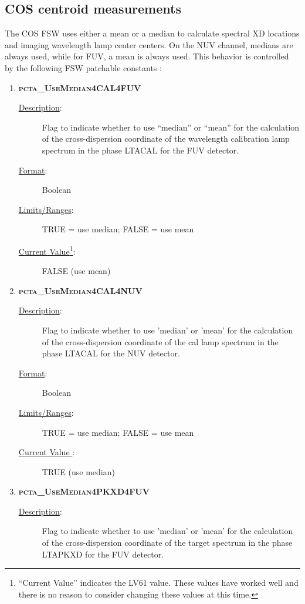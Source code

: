 \subsection{COS centroid measurements}
	The COS FSW uses either a mean or a median to calculate spectral XD locations and imaging wavelength lamp center centers.
On the NUV channel, medians are always used, while for FUV, a mean is always used. This
behavior is controlled by the following FSW patchable constants :\\
\footnotesize
\begin{enumerate}
	\setlength{\parskip}{-1pt}
	\setlength{\parsep}{0pt}
	\setlength\itemsep{0.1em}
\item{\textsc{\bf pcta\_UseMedian4CAL4FUV}}
	\begin{description}
	\item[\underline{\rm Description}:]Flag to indicate whether to use ``median'' or ``mean'' for the calculation of the cross-dispersion coordinate of the wavelength calibration lamp spectrum in the phase \textsc{LTACAL} for the FUV detector.
	\item[\underline{\rm Format}:]    Boolean
	\item[\underline{\rm Limits/Ranges}:]  TRUE = use median;  FALSE = use mean
	\item[\underline{\rm Current Value}\footnote{``Current Value'' indicates the LV61 value. These values have worked well and there is no reason to consider changing these values at this time.}:]  FALSE (use mean)
\end{description}
\item{\textsc{\bf pcta\_UseMedian4CAL4NUV}}
	\begin{description}
	\item[\underline{\rm Description}:]Flag to indicate whether to use 'median' or 'mean' for the calculation of the cross-dispersion coordinate of the cal lamp spectrum in the phase \textsc{LTACAL} for the NUV detector.
	\item[\underline{\rm Format}:]    Boolean
	\item[\underline{\rm Limits/Ranges}:]  TRUE = use median;  FALSE = use mean
	\item[\underline{\rm Current Value }:]   TRUE (use median)
\end{description}
\item{\textsc{\bf pcta\_UseMedian4PKXD4FUV}}
	\begin{description}
	\item[\underline{\rm Description}:]Flag to indicate whether to use 'median' or 'mean' for the calculation of the cross-dispersion coordinate of the target spectrum in the phase \textsc{LTAPKXD} for the FUV detector.

\end{description}
\end{enumerate}
